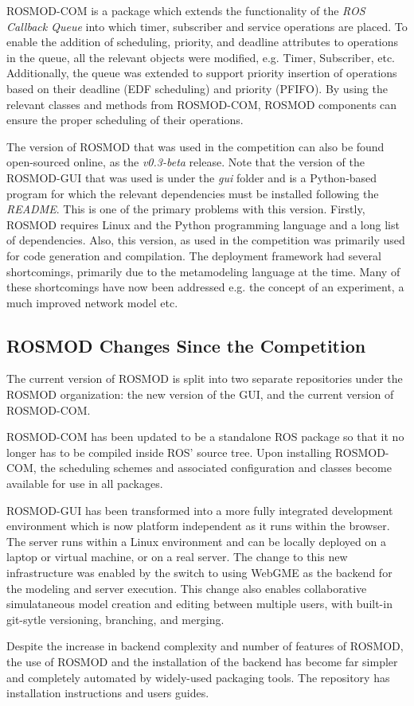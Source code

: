 ROSMOD-COM is a package which extends the functionality of the
\emph{ROS Callback Queue} into which timer, subscriber and service
operations are placed.  To enable the addition of scheduling,
priority, and deadline attributes to operations in the queue, all the
relevant objects were modified, e.g. Timer, Subscriber, etc.
Additionally, the queue was extended to support priority insertion of
operations based on their deadline (EDF scheduling) and priority
(PFIFO).  By using the relevant classes and methods from ROSMOD-COM,
ROSMOD components can ensure the proper scheduling of their
operations.

The version of ROSMOD that was used in the competition can also be
found open-sourced online\cite{ROSMOD}, as the \emph{v0.3-beta}
release.  Note that the version of the ROSMOD-GUI that was used is
under the \emph{gui} folder and is a Python-based program for which
the relevant dependencies must be installed following the
\emph{README}.  This is one of the primary problems with this version. Firstly, ROSMOD requires Linux and the Python programming language and a long list of dependencies. Also, this version, as used in the competition was primarily used for code generation and compilation. The deployment framework had several shortcomings, primarily due to the metamodeling language at the time. Many of these shortcomings have now been addressed e.g. the concept of an experiment, a much improved network model etc. 

\subsection{ROSMOD Changes Since the Competition}
The current version of ROSMOD is split into two
separate repositories under the ROSMOD organization: the new version
of the GUI\cite{ROSMOD_WEBGME}, and the current version of
ROSMOD-COM\cite{ROSMOD}.

ROSMOD-COM has been updated to be a standalone ROS package so that it
no longer has to be compiled inside ROS' source tree.  Upon installing
ROSMOD-COM, the scheduling schemes and associated configuration and
classes become available for use in all packages.

ROSMOD-GUI has been transformed into a more fully integrated
development environment which is now platform independent as it runs
within the browser.  The server runs within a Linux environment and
can be locally deployed on a laptop or virtual machine, or on a real
server.  The change to this new infrastructure was enabled by the
switch to using WebGME\cite{maroti2014next} as the backend for the modeling and
server execution.  This change also enables collaborative
simulataneous model creation and editing between multiple users, with
built-in git-sytle versioning, branching, and merging.

Despite the increase in backend complexity and number of features of
ROSMOD, the use of ROSMOD and the installation of the backend has
become far simpler and completely automated by widely-used packaging
tools.  The repository has installation instructions and users guides.
